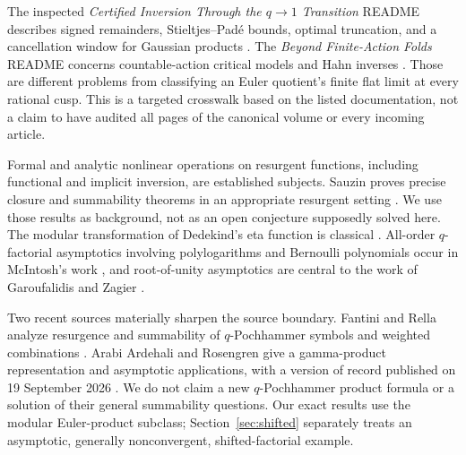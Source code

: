 \documentclass[11pt,a4paper]{article}
\numberwithin{equation}{section}
\theoremstyle{definition}\newtheorem{definition}[theorem]{Definition}
\theoremstyle{remark}\newtheorem{remark}[theorem]{Remark}
\begin{document}
The inspected \emph{Certified Inversion Through the $q\to1$ Transition}
README describes signed remainders, Stieltjes--Pad\'e bounds, optimal
truncation, and a cancellation window for Gaussian products
\cite{repoq}. The \emph{Beyond Finite-Action Folds} README concerns
countable-action critical models and Hahn inverses \cite{repohahn}.
Those are different problems from classifying an Euler quotient's finite
flat limit at every rational cusp. This is a targeted crosswalk based on
the listed documentation, not a claim to have audited all pages of the
canonical volume or every incoming article.

Formal and analytic nonlinear operations on resurgent functions, including
functional and implicit inversion, are established subjects. Sauzin proves
precise closure and summability theorems in an appropriate resurgent
setting \cite{sauzin}. We use those results as background, not as an open
conjecture supposedly solved here. The modular transformation of Dedekind's
eta function is classical \cite{dlmf}. All-order $q$-factorial asymptotics
involving polylogarithms and Bernoulli polynomials occur in McIntosh's work
\cite{mcintosh}, and root-of-unity asymptotics are central to the work of
Garoufalidis and Zagier \cite{gz}.

Two recent sources materially sharpen the source boundary. Fantini and
Rella analyze resurgence and summability of $q$-Pochhammer symbols and
weighted combinations \cite{fr}. Arabi Ardehali and Rosengren give a
gamma-product representation and asymptotic applications, with a version
of record published on 19 September 2026 \cite{ar}. We do not claim a new
$q$-Pochhammer product formula or a solution of their general summability
questions. Our exact results use the modular Euler-product subclass;
Section~\ref{sec:shifted} separately treats an asymptotic, generally
nonconvergent, shifted-factorial example.
\end{document}
